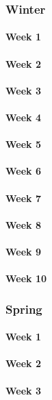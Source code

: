 \documentclass[draftclsnofoot, onecolumn, compsoc, 10pt]{IEEEtran}
\begin{document}
\subsubsection{Winter}
\paragraph{Week 1}
\paragraph{Week 2}
\paragraph{Week 3}
\paragraph{Week 4}
\paragraph{Week 5}
\paragraph{Week 6}
\paragraph{Week 7}
\paragraph{Week 8}
\paragraph{Week 9}
\paragraph{Week 10}

\subsubsection{Spring}
\paragraph{Week 1}
\paragraph{Week 2}
\paragraph{Week 3}
\end{document}
